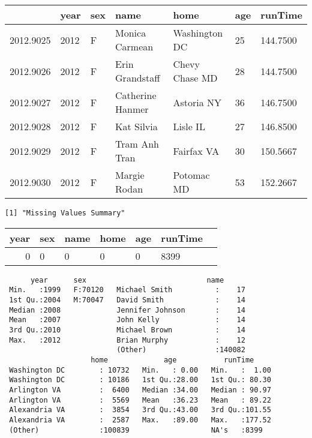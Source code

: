 \documentclass[11pt]{article}
\begin{document}
    
    \begin{tabular}{r|llllll}
  & year & sex & name & home & age & runTime\\
\hline
	2012.9025 & 2012                    & F                       & Monica Carmean          & Washington DC           & 25                      & 144.7500               \\
	2012.9026 & 2012                    & F                       & Erin Grandstaff         & Chevy Chase MD          & 28                      & 144.7500               \\
	2012.9027 & 2012                    & F                       & Catherine Hanmer        & Astoria NY              & 36                      & 146.7500               \\
	2012.9028 & 2012                    & F                       & Kat Silvia              & Lisle IL                & 27                      & 146.8500               \\
	2012.9029 & 2012                    & F                       & Tram Anh Tran           & Fairfax VA              & 30                      & 150.5667               \\
	2012.9030 & 2012                    & F                       & Margie Rodan            & Potomac MD              & 53                      & 152.2667               \\
\end{tabular}


    
    \begin{Verbatim}[commandchars=\\\{\}]
[1] "Missing Values Summary"

    \end{Verbatim}

    \begin{tabular}{r|llllll}
 year & sex & name & home & age & runTime\\
\hline
	 0    & 0    & 0    & 0    & 0    & 8399\\
\end{tabular}


    
    
    \begin{verbatim}
      year      sex                            name       
 Min.   :1999   F:70120   Michael Smith          :    17  
 1st Qu.:2004   M:70047   David Smith            :    14  
 Median :2008             Jennifer Johnson       :    14  
 Mean   :2007             John Kelly             :    14  
 3rd Qu.:2010             Michael Brown          :    14  
 Max.   :2012             Brian Murphy           :    12  
                          (Other)                :140082  
                    home             age           runTime      
 Washington DC        : 10732   Min.   : 0.00   Min.   :  1.00  
 Washington DC        : 10186   1st Qu.:28.00   1st Qu.: 80.30  
 Arlington VA         :  6400   Median :34.00   Median : 90.97  
 Arlington VA         :  5569   Mean   :36.23   Mean   : 89.22  
 Alexandria VA        :  3854   3rd Qu.:43.00   3rd Qu.:101.55  
 Alexandria VA        :  2587   Max.   :89.00   Max.   :177.52  
 (Other)              :100839                   NA's   :8399    
    \end{verbatim}
\end{document}
